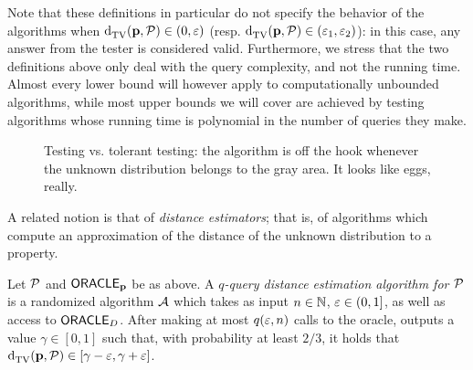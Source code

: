 Note that these definitions in particular do not specify the behavior of the algorithms when ${\operatorname{d}_{\rm{TV}}^{}\!\left({\mathbf{p}, \mathcal{P}}\right)} \in (0,\varepsilon)$ (resp. ${\operatorname{d}_{\rm{TV}}^{}\!\left({\mathbf{p}, \mathcal{P}}\right)} \in (\varepsilon_1,\varepsilon_2)$): in this case, any answer from the tester is considered valid. Furthermore, we stress that the two definitions above only deal with the query complexity, and not the running time. Almost every lower bound will however apply to computationally unbounded algorithms, while most upper bounds we will cover are achieved by testing algorithms whose running time is polynomial in the number of queries they make.

\begin{figure}[H]\centering
  \caption{\label{fig:testing:tolerant:testing}Testing vs. tolerant testing: the algorithm is off the hook whenever the unknown distribution belongs to the gray area. It looks like eggs, really.}%
\end{figure}

A related notion is that of \emph{distance estimators}; that is, of algorithms which compute an approximation of the distance of the unknown distribution to a property.
\begin{definition}\label{def:distance:estimation}
  Let $\mathcal{P}$ and ${\sf ORACLE}_{\mathbf{p}}$ be as above. A \emph{$q$-query distance estimation algorithm for $\mathcal{P}$} is a randomized algorithm $\mathcal{A}$ which takes as input $n\in\mathbb{N}$, $\varepsilon\in(0,1]$, as well as access to ${\sf ORACLE}_D$. After making at most $q(\varepsilon,n)$ calls to the oracle, \Tester outputs a value $\gamma\in[0,1]$ such that,  with probability at least $2/3$, it holds that ${\operatorname{d}_{\rm{TV}}^{}\!\left({\mathbf{p}, \mathcal{P}}\right)}\in[\gamma-\varepsilon, \gamma+\varepsilon]$.
\end{definition}

